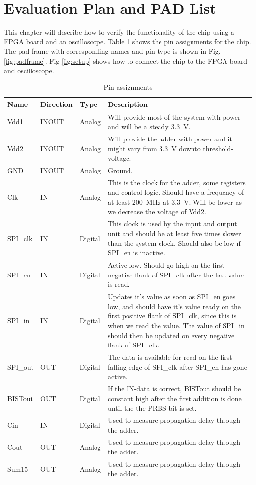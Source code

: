 \section{Evaluation Plan and PAD List}
This chapter will describe how to verify the functionality of the chip using a FPGA board and an oscilloscope.
Table \ref{tab:pins} shows the pin assignments for the chip. The pad frame with corresponding names and pin type is shown in Fig. \ref{fig:padframe}. Fig \ref{fig:setup} shows how to connect the chip to the FPGA board and oscilloscope.

\begin{table}[H]
  \caption{Pin assignments}
  \centering
  \begin{tabularx}{\linewidth}{|l|l|l|X|}
    \hline
    \textbf{Name} & \textbf{Direction} & \textbf{Type} & \textbf{Description} \\ \hline
    Vdd1 & INOUT & Analog & Will provide most of the system with power and will be a steady \SI{3.3}{\volt}. \\ \hline
    Vdd2 & INOUT & Analog & Will provide the adder with power and it might vary from \SI{3.3}{\volt} downto threshold-voltage. \\ \hline
    GND &  INOUT & Analog & Ground. \\ \hline
    Clk & IN & Analog & This is the clock for the adder, some registers and control logic. Should have a frequency of at least \SI{200}{\mega\hertz} at \SI{3.3}{\volt}. Will be lower as we decrease the voltage of Vdd2. \\ \hline
    SPI\_clk & IN & Digital & This clock is used by the input and output unit and should be at least five times slower than the system clock. Should also be low if SPI\_en is inactive. \\ \hline
    SPI\_en & IN & Digital & Active low. Should go high on the first negative flank of SPI\_clk after the last value is read. \\ \hline
    SPI\_in & IN & Digital & Updates it's value as soon as SPI\_en goes low, and should have it's value ready on the first positive flank of SPI\_clk, since this is when we read the value. The value of SPI\_in should then be updated on every negative flank of SPI\_clk. \\ \hline
    SPI\_out & OUT & Digital & The data is available for read on the first falling edge of SPI\_clk after SPI\_en has gone active. \\ \hline
    BISTout & OUT & Digital & If the IN-data is correct, BISTout should be constant high after the first addition is done until the the PRBS-bit is set.  \\ \hline
    Cin & IN & Digital & Used to measure propagation delay through the adder. \\ \hline
    Cout & OUT & Analog & Used to measure propagation delay through the adder. \\ \hline
    Sum15 & OUT & Analog & Used to measure propagation delay through the adder. \\ \hline
  \end{tabularx}
  \label{tab:pins}
\end{table}

